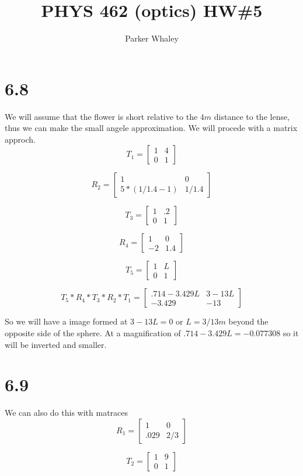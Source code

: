 \documentclass[12pt,a4paper]{article}
\author{Parker Whaley}
\title{PHYS 462 (optics) HW\#5}
\begin{document}
\maketitle
\section{6.8}
We will assume that the flower is short relative to the $4m$ distance to the lense, thus we can make the small angele approximation.  We will procede with a matrix approch.
$$
T_1=
\begin{bmatrix}
1 & 4\\
0 & 1
\end{bmatrix}$$

$$
R_2=
\begin{bmatrix}
1 & 0\\
5*(1/1.4-1) & 1/1.4
\end{bmatrix}$$

$$
T_3=
\begin{bmatrix}
1 & .2\\
0 & 1
\end{bmatrix}$$

$$
R_4=
\begin{bmatrix}
1 & 0\\
-2 & 1.4
\end{bmatrix}$$

$$
T_5=
\begin{bmatrix}
1 & L\\
0 & 1
\end{bmatrix}$$

$$
T_5 * R_4 * T_3 * R_2 * T_1=
\begin{bmatrix}
.714-3.429L&3-13L\\
-3.429 & -13
\end{bmatrix}$$

So we will have a image formed at $3-13L=0$ or $L=3/13m$ beyond the opposite side of the sphere.  At a magnification of $.714-3.429L=-0.077308$ so it will be inverted and smaller.

\section{6.9}
We can also do this with matraces
$$
R_1=
\begin{bmatrix}
1&   0\\
.029 &  2/3
\end{bmatrix}$$

$$
T_2=
\begin{bmatrix}
1 & 9\\
0 & 1
\end{bmatrix}$$
\end{document}
